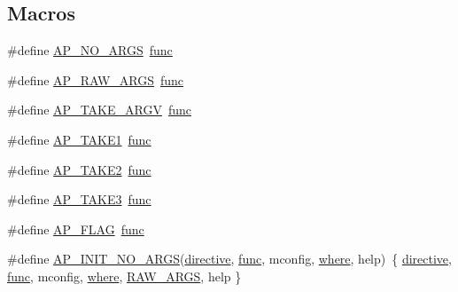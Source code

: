 \subsection*{Macros}
\begin{DoxyCompactItemize}
\item 
\#define \hyperlink{group__APACHE__CORE__CONFIG_ga3a23b73884dcc84f62347035feecb236}{A\+P\+\_\+\+N\+O\+\_\+\+A\+R\+GS}~\hyperlink{group__apr__thread__proc_ga40bf04c29bfb67c93dc7dc5075531285}{func}
\item 
\#define \hyperlink{group__APACHE__CORE__CONFIG_gaee08e2bd184270a01685ffec7a962e6b}{A\+P\+\_\+\+R\+A\+W\+\_\+\+A\+R\+GS}~\hyperlink{group__apr__thread__proc_ga40bf04c29bfb67c93dc7dc5075531285}{func}
\item 
\#define \hyperlink{group__APACHE__CORE__CONFIG_gaeafa400a7c6388b13a38d469f6cbca4a}{A\+P\+\_\+\+T\+A\+K\+E\+\_\+\+A\+R\+GV}~\hyperlink{group__apr__thread__proc_ga40bf04c29bfb67c93dc7dc5075531285}{func}
\item 
\#define \hyperlink{group__APACHE__CORE__CONFIG_ga1f074abcaa85b893817adee6ea2dc816}{A\+P\+\_\+\+T\+A\+K\+E1}~\hyperlink{group__apr__thread__proc_ga40bf04c29bfb67c93dc7dc5075531285}{func}
\item 
\#define \hyperlink{group__APACHE__CORE__CONFIG_gab5ae54825b0b4b414b21bbd619e6c092}{A\+P\+\_\+\+T\+A\+K\+E2}~\hyperlink{group__apr__thread__proc_ga40bf04c29bfb67c93dc7dc5075531285}{func}
\item 
\#define \hyperlink{group__APACHE__CORE__CONFIG_gaacf930c9d842396ad08f860e3f25b9ec}{A\+P\+\_\+\+T\+A\+K\+E3}~\hyperlink{group__apr__thread__proc_ga40bf04c29bfb67c93dc7dc5075531285}{func}
\item 
\#define \hyperlink{group__APACHE__CORE__CONFIG_ga96388d2cb6b4f560e7abb32d1c181bbb}{A\+P\+\_\+\+F\+L\+AG}~\hyperlink{group__apr__thread__proc_ga40bf04c29bfb67c93dc7dc5075531285}{func}
\item 
\#define \hyperlink{group__APACHE__CORE__CONFIG_gacbd3d31315c0cc27e0631f062eccfc4c}{A\+P\+\_\+\+I\+N\+I\+T\+\_\+\+N\+O\+\_\+\+A\+R\+GS}(\hyperlink{basic-configuration_8txt_afff511b23780162b3e88a118ec5cb4c9}{directive},  \hyperlink{group__apr__thread__proc_ga40bf04c29bfb67c93dc7dc5075531285}{func},  mconfig,  \hyperlink{group__apr__network__io_ga40101ce9c63cc7ab2b80f6f8c0e7086c}{where},  help)~\{ \hyperlink{basic-configuration_8txt_afff511b23780162b3e88a118ec5cb4c9}{directive}, \hyperlink{group__apr__thread__proc_ga40bf04c29bfb67c93dc7dc5075531285}{func}, mconfig, \hyperlink{group__apr__network__io_ga40101ce9c63cc7ab2b80f6f8c0e7086c}{where}, \hyperlink{group__APACHE__CORE__CONFIG_gga07442bbd6a047ee13383f52b9670b026a073c760805981925832e4689519ff06d}{R\+A\+W\+\_\+\+A\+R\+GS}, help \}

\end{DoxyCompactItemize}
